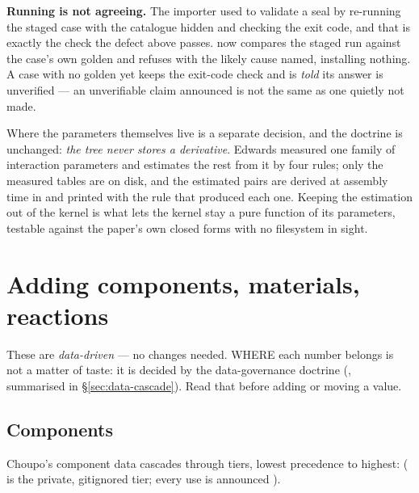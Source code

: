 \documentclass[11pt,a4paper]{article}
\begin{document}
\begin{keyidea}
\textbf{Running is not agreeing.}  The importer used to validate a seal by
re-running the staged case with the catalogue hidden and checking the exit
code, and that is exactly the check the defect above passes.
 now compares the staged run against the
case's own  golden and refuses with the likely cause named,
installing nothing.  A case with no golden yet keeps the exit-code check and
is \emph{told} its answer is unverified --- an unverifiable claim announced
is not the same as one quietly not made.
\end{keyidea}

\noindent Where the parameters themselves live is a separate decision, and
the doctrine is unchanged: \emph{the tree never stores a derivative}.  Edwards
measured one family of interaction parameters and estimates the rest from it
by four rules; only the measured tables are on disk, and the estimated pairs
are derived at assembly time in  and printed with
the rule that produced each one.  Keeping the estimation out of the kernel is
what lets the kernel stay a pure function of its parameters, testable against
the paper's own closed forms with no filesystem in sight.

\section{Adding components, materials, reactions}\label{sec:add-data}

These are \emph{data-driven} --- no \cpp{} changes needed.  WHERE each number
belongs is not a matter of taste: it is decided by the data-governance doctrine
(, summarised in \S\ref{sec:data-cascade}).
Read that before adding or moving a value.

\subsection{Components}

Choupo's component data cascades through tiers, lowest precedence to highest:
 ( is the private,
gitignored  tier; every use is announced
).
\end{document}

